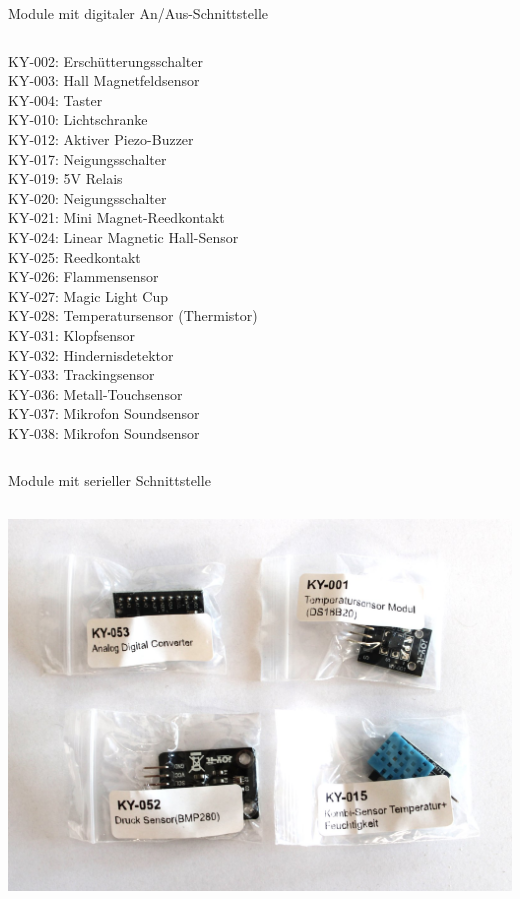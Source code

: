 {\begin{frame}{Module mit digitaler An/Aus-Schnittstelle}
\begin{columns}
        KY-002: Erschütterungsschalter \\
        KY-003: Hall Magnetfeldsensor \\
        KY-004: Taster \\
        KY-010: Lichtschranke \\
        KY-012: Aktiver Piezo-Buzzer \\
        KY-017: Neigungsschalter \\
        KY-019: 5V Relais \\
        KY-020: Neigungsschalter \\
        KY-021: Mini Magnet-Reedkontakt \\
        KY-024: Linear Magnetic Hall-Sensor \\
        KY-025: Reedkontakt \\
        KY-026: Flammensensor \\
        KY-027: Magic Light Cup \\
        KY-028: Temperatursensor (Thermistor) \\
        KY-031: Klopfsensor \\
        KY-032: Hindernisdetektor \\
        KY-033: Trackingsensor \\
        KY-036: Metall-Touchsensor \\
        KY-037: Mikrofon Soundsensor \\
        KY-038: Mikrofon Soundsensor \\
    \end{columns}
\end{frame}

\begin{frame}{Module mit serieller Schnittstelle}
    \begin{columns}
        \includegraphics[width=\textwidth]{2-hardwaredesign/img/sensorkit_seriell}


\end{columns}
\end{frame}}
